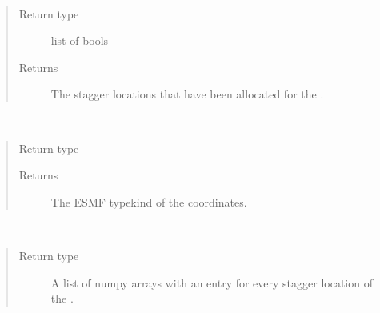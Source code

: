 \documentclass[letterpaper,10pt,english]{sphinxmanual}
\begin{document}
\begin{fulllineitems}
\begin{fulllineitems}
\label{\detokenize{grid:ESMF.api.grid.Grid.staggerloc}}~\begin{quote}\begin{description}
\item[{Return type}] \leavevmode
list of bools

\item[{Returns}] \leavevmode
The stagger locations that have been allocated for the
{\hyperref[\detokenize{grid:ESMF.api.grid.Grid}]{}}.

\end{description}\end{quote}

\end{fulllineitems}


\begin{fulllineitems}
\label{\detokenize{grid:ESMF.api.grid.Grid.type}}~\begin{quote}\begin{description}
\item[{Return type}] \leavevmode
{\hyperref[\detokenize{TypeKind:ESMF.api.constants.TypeKind}]{}}

\item[{Returns}] \leavevmode
The ESMF typekind of the {\hyperref[\detokenize{grid:ESMF.api.grid.Grid}]{}}
coordinates.

\end{description}\end{quote}

\end{fulllineitems}


\begin{fulllineitems}
\label{\detokenize{grid:ESMF.api.grid.Grid.upper_bounds}}~\begin{quote}\begin{description}
\item[{Return type}] \leavevmode
A list of numpy arrays with an entry for every stagger location
of the {\hyperref[\detokenize{grid:ESMF.api.grid.Grid}]{}}.


\end{description}
\end{quote}
\end{fulllineitems}
\end{fulllineitems}
\end{document}
